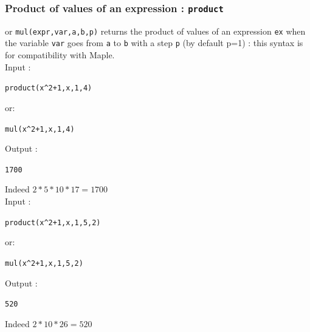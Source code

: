 \documentclass[a4paper,11pt]{book}
\begin{document}
\subsubsection{Product of values of an expression : {\tt product}}\label{sec:product0}
 or {\tt mul(expr,var,a,b,p)} returns the
product of values of an expression {\tt ex} when the variable {\tt var} goes 
from {\tt a} to {\tt b} with a step {\tt p} (by default p=1) : this syntax is 
for compatibility with Maple.\\
Input :
\begin{center}{\tt product(x\verb|^|2+1,x,1,4)}\end{center}
or:
\begin{center}{\tt mul(x\verb|^|2+1,x,1,4)}\end{center}
Output :
\begin{center}{\tt 1700}\end{center}
Indeed $2*5*10*17=1700$\\
Input :
\begin{center}{\tt product(x\verb|^|2+1,x,1,5,2)}\end{center}
or:
\begin{center}{\tt mul(x\verb|^|2+1,x,1,5,2)}\end{center}
Output :
\begin{center}{\tt 520}\end{center}
Indeed $2*10*26=520$
\end{document}
